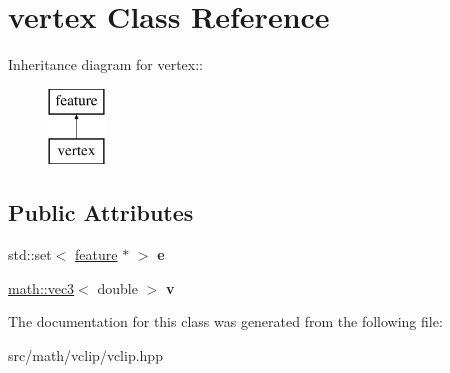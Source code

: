 \hypertarget{classvertex}{
\section{vertex Class Reference}
\label{classvertex}
}
Inheritance diagram for vertex::\begin{figure}[H]
\begin{center}
\leavevmode
\includegraphics[height=2cm]{classvertex}
\end{center}
\end{figure}
\subsection*{Public Attributes}
\begin{DoxyCompactItemize}
\item 
\hypertarget{classvertex_a0cfa1be3d73ef4d1cd4a546f6c4b9b5d}{
std::set$<$ \hyperlink{classfeature}{feature} $\ast$ $>$ {\bfseries e}}
\label{classvertex_a0cfa1be3d73ef4d1cd4a546f6c4b9b5d}

\item 
\hypertarget{classvertex_a2981aef6dcfdc1f9cc3db752c4c3cfa2}{
\hyperlink{classmath_1_1vec3}{math::vec3}$<$ double $>$ {\bfseries v}}
\label{classvertex_a2981aef6dcfdc1f9cc3db752c4c3cfa2}

\end{DoxyCompactItemize}


The documentation for this class was generated from the following file:\begin{DoxyCompactItemize}
\item 
src/math/vclip/vclip.hpp\end{DoxyCompactItemize}
